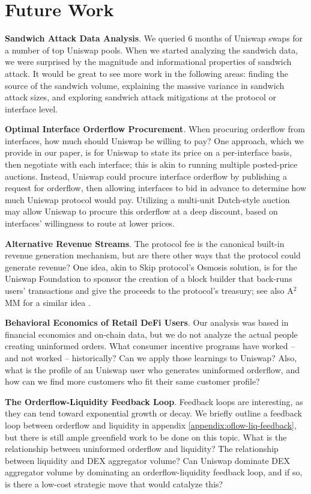 \section{Future Work} \label{section:future-work}

\textbf{Sandwich Attack Data Analysis}. We queried 6 months of Uniswap swaps for a number of top Uniswap pools. When we started analyzing the sandwich data, we were surprised by the magnitude and informational properties of sandwich attack. It would be great to see more work in the following areas: finding the source of the sandwich volume, explaining the massive variance in sandwich attack sizes, and exploring sandwich attack mitigations at the protocol or interface level.

\textbf{Optimal Interface Orderflow Procurement}. When procuring orderflow from interfaces, how much should Uniswap be willing to pay? One approach, which we provide in our paper, is for Uniswap to state its price on a per-interface basis, then negotiate with each interface; this is akin to running multiple posted-price auctions. Instead, Uniswap could procure interface orderflow by publishing a request for orderflow, then allowing interfaces to bid in advance to determine how much Uniswap protocol would pay. Utilizing a multi-unit Dutch-style auction may allow Uniswap to procure this orderflow at a deep discount, based on interfaces' willingness to route at lower prices. %

\textbf{Alternative Revenue Streams}. The protocol fee is the canonical built-in revenue generation mechanism, but are there other ways that the protocol could generate revenue? One idea, akin to Skip protocol's Osmosis solution, is for the Uniswap Foundation to sponsor the creation of a block builder that back-runs users' transactions and give the proceeds to the protocol's treasury; see also A$^2$MM for a similar idea \cite{zhou2021a2mm}.

\textbf{Behavioral Economics of Retail DeFi Users}. Our analysis was based in financial economics and on-chain data, but we do not analyze the actual people creating uninformed orders. What consumer incentive programs have worked -- and not worked -- historically? Can we apply those learnings to Uniswap? Also, what is the profile of an Uniswap user who generates uninformed orderflow, and how can we find more customers who fit their same customer profile?

\textbf{The Orderflow-Liquidity Feedback Loop}. Feedback loops are interesting, as they can tend toward exponential growth or decay. We briefly outline a feedback loop between orderflow and liquidity in appendix \ref{appendix:oflow-liq-feedback}, but there is still ample greenfield work to be done on this topic. What is the relationship between uninformed orderflow and liquidity? The relationship between liquidity and DEX aggregator volume? Can Uniswap dominate DEX aggregator volume by dominating an orderflow-liquidity feedback loop, and if so, is there a low-cost strategic move that would catalyze this?
